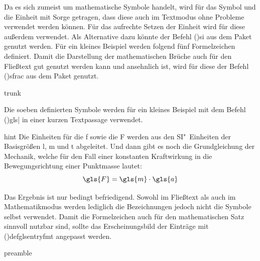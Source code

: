 \documentclass[%
  english,ngerman,%
  cdgeometry=no,DIV=12,%
  cd=false,cdfont=false,cdtitle=true,%
  headings=normal,%
  automark,%
  listof=toc,%
]{tudscrartcl}
\begin{document}
Da es sich zumeist um mathematische Symbole handelt, wird für das Symbol und 
die Einheit mit  Sorge getragen, dass diese auch im 
Textmodus ohne Probleme verwendet werden können. Für das aufrechte Setzen der 
Einheit wird für diese außerdem  verwendet. Als Alternative dazu 
könnte der Befehl \Macro(){si} aus dem Paket  
genutzt werden. Für ein kleines Beispiel werden folgend fünf Formelzeichen 
definiert. Damit die Darstellung der mathematischen Brüche auch für den 
Fließtext gut genutzt werden kann und ansehnlich ist, wird für diese der Befehl 
\Macro(){sfrac} aus dem Paket  genutzt.
%
\CodeHook{\renewcommand*\newglossaryentry[2]{}}
\begin{Code}[input]{trunk}

\end{Code}

Die soeben definierten Symbole werden für ein kleines Beispiel mit dem Befehl 
\Macro(){gls|} in einer kurzen 
Textpassage verwendet.
%
\begin{Code}[input]{hint}
Die Einheiten für die \gls{f} sowie die \gls{F} werden aus den 
SI"~Einheiten der Basisgrößen \gls{l}, \gls{m} und \gls{t} abgeleitet.
Und dann gibt es noch die Grundgleichung der Mechanik, welche für den
Fall einer konstanten Kraftwirkung in die Bewegungsrichtung einer
Punktmasse lautet:
\[\gls{F} = \gls{m} \cdot \gls{a}\]
\end{Code}

Das Ergebnis ist nur bedingt befriedigend. Sowohl im Fließtext als auch im 
Mathematikmodus werden lediglich die Bezeichnungen jedoch nicht die Symbole 
selbst verwendet. Damit die Formelzeichen auch für den mathematischen Satz 
sinnvoll nutzbar sind, sollte das Erscheinungsbild der Einträge mit 
\Macro(){defglsentryfmt} angepasst werden.
%
\begin{Code}[input]{preamble}
\end{Code}
\end{document}
